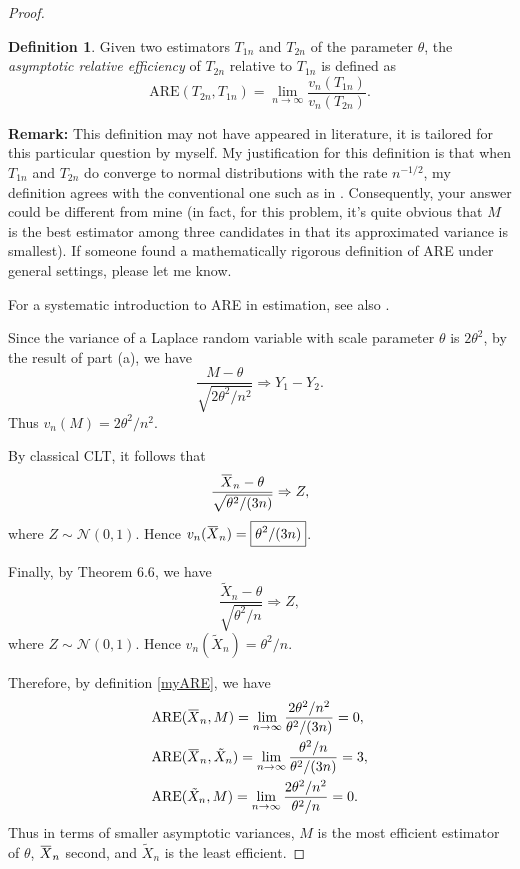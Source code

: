 \documentclass{article}
\newcommand{\overbar}[1]{\mkern 1.5mu\overline{\mkern-1.5mu#1\mkern-1.5mu}\mkern 1.5mu}
\newcommand{\gaussian}{\mathcal{N}}
\theoremstyle{definition}
\newtheorem*{defn}{Definition}
\theoremstyle{plain}
\theoremstyle{remark}
\begin{document}
\begin{description}
\begin{description}
\begin{proof}
\begin{defn}
Given two estimators $T_{1n}$ and $T_{2n}$ of the parameter $\theta$, the \emph{asymptotic relative efficiency} of $T_{2n}$ relative to $T_{1n}$ is defined as
\begin{equation}\label{myARE}
\text{ARE}(T_{2n}, T_{1n}) = \lim_{n \to \infty} \frac{v_n(T_{1n})}{v_n(T_{2n})}.
\end{equation}
\end{defn}
 
\textbf{Remark:} This definition may not have appeared in literature, it is tailored for this particular question by myself. My justification for this definition is that when $T_{1n}$ and $T_{2n}$ do converge to normal distributions with the rate $n^{-1/2}$, my definition agrees with the conventional one such as in \cite{ferguson1996}. Consequently, your answer could be different from mine (in fact, for this problem, it's quite obvious that $M$ is the best estimator
among three candidates in that its approximated variance is smallest). If someone found a mathematically rigorous definition of ARE under general settings, please let me know. 

For a systematic introduction to ARE in estimation, see also \cite{serfling2011asymptotic}.

Since the variance of a Laplace random variable with scale parameter $\theta$ is $2\theta^2$, by the result of part (a), we have
\begin{equation*}
\frac{M - \theta}{\sqrt{2\theta^2/n^2}} \Rightarrow Y_1 - Y_2.
\end{equation*}
Thus $v_n(M) = \boxed{2\theta^2/n^2}$.

By classical CLT, it follows that
$$\frac{\overbar{X}_n - \theta}{\sqrt{\theta^2/(3n)}} \Rightarrow Z,$$
where $Z \sim \gaussian(0, 1)$. Hence $v_n(\overbar{X}_n) = \boxed{\theta^2/(3n)}$. 

Finally, by Theorem $6.6$, we have
$$\frac{\tilde{X}_n - \theta}{\sqrt{\theta^2/n}} \Rightarrow Z,$$
where $Z \sim \gaussian(0, 1)$. Hence $v_n(\tilde{X}_n) = \boxed{\theta^2/n}$. 

Therefore, by definition \eqref{myARE}, we have
\begin{align*}
& \text{ARE}(\overbar{X}_n, M) = \lim_{n \to \infty} \frac{2\theta^2/n^2}{\theta^2/(3n)} = 0, \\
& \text{ARE}(\overbar{X}_n, \tilde{X}_n) = \lim_{n \to \infty} \frac{\theta^2/n}{\theta^2/(3n)} = 3, \\
& \text{ARE}(\tilde{X}_n, M) = \lim_{n \to \infty} \frac{2\theta^2/n^2}{\theta^2/n} = 0.
\end{align*}
Thus in terms of smaller asymptotic variances, $M$ is the most efficient estimator of $\theta$, $\overbar{X}_n$ second, and $\tilde{X}_n$ is the least efficient.
\end{proof}
\end{description}


\end{description}
\end{document}
